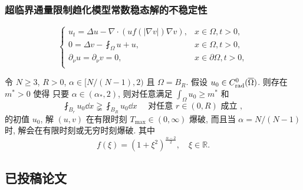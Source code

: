 \begin{frame}
  \frametitle{超临界通量限制趋化模型常数稳态解的不稳定性}
  \begin{equation}\label{sys: my ks flux limitation}
    \begin{cases}
      u_t=\Delta u-\nabla \cdot\left(u f\left(|\nabla v|\right) \nabla v\right), & x\in\Omega, t > 0,       \\
      0=\Delta v - \fint_\Omega u + u,                                                          & x\in\Omega, t>0,         \\
      \partial_\nu u = \partial_\nu v = 0,                                       & x\in\partial\Omega, t>0, \\
    \end{cases}
  \end{equation}
  \begin{theorem}[M-Li-2024-NA]
    \label{thm: large constant steady state is unstable}
    令 $N\geq3$, $R>0$, \(\alpha\in[N/(N-1),2)\) 且
    $\Omega=B_R$.
    假设 $u_0\in C_{\operatorname*{rad}}^0(\overline{\Omega})$.
    则存在 $m^\ast > 0$ 使得 只要 \(\alpha\in(\alpha_\ast, 2)\),
    则对任意满足
    \(\int_{\Omega} u_0 \geq m^\ast\)
    和
    \begin{equation}\label{h: concentrate more than average mass}
      \fint_{B_r}u_0 \dd x\gneqq \fint_{B_R}u_0 \dd x
      \quad\text{ 对任意 }r\in(0, R) \text{ 成立 },
    \end{equation}
    的初值 $u_0$,
    解 $(u, v)$ 在有限时刻 $T_{\max}\in(0,\infty)$ 爆破,
    而且当 $\alpha = N/(N-1)$ 时, 解会在有限时刻或无穷时刻爆破. 其中
    \begin{equation}
      \label{sym: f a lipschitz continuous function}
      f(\xi)=(1+\xi^2)^{\frac{\alpha-2}{2}},
      \quad \xi\in\mathbb{R}.
    \end{equation}
  \end{theorem}
\end{frame}

\subsection{已投稿论文}

